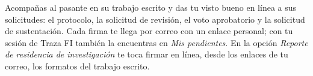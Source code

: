 \documentclass[11pt,a4paper]{article}
\begin{document}
{\small\tableofcontents}
\newpage
\begin{quevasahacer}
Acompañas al pasante en su trabajo escrito y das tu visto bueno en línea a sus solicitudes: el protocolo, la solicitud de revisión, el voto aprobatorio y la solicitud de sustentación. Cada firma te llega por correo con un enlace personal; con tu sesión de Traza FI también la encuentras en \emph{Mis pendientes}. En la opción \emph{Reporte de residencia de investigación} te toca firmar en línea, desde los enlaces de tu correo, los formatos del trabajo escrito.
\end{quevasahacer}



\end{document}
